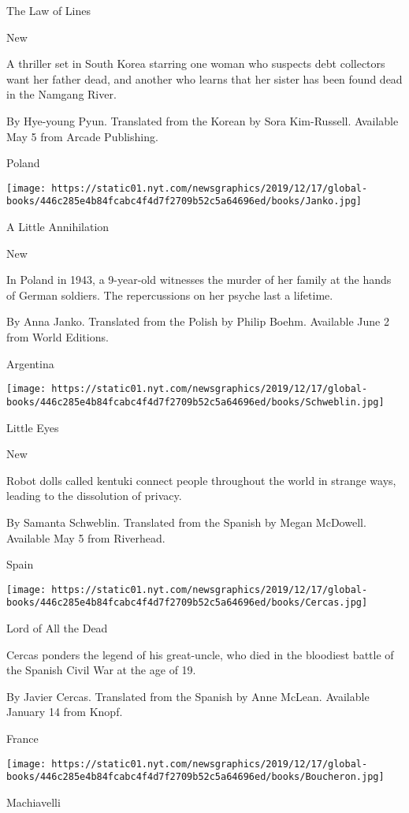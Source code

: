 The Law of Lines

New

A thriller set in South Korea starring one woman who suspects debt
collectors want her father dead, and another who learns that her sister
has been found dead in the Namgang River.

 By Hye-young Pyun. Translated from the Korean by Sora Kim-Russell.
Available May 5 from Arcade Publishing.

Poland

\texttt{[image: https://static01.nyt.com/newsgraphics/2019/12/17/global-books/446c285e4b84fcabc4f4d7f2709b52c5a64696ed/books/Janko.jpg]}

A Little Annihilation

New

In Poland in 1943, a 9-year-old witnesses the murder of her family at
the hands of German soldiers. The repercussions on her psyche last a
lifetime.

 By Anna Janko. Translated from the Polish by Philip Boehm. Available
June 2 from World Editions.

Argentina

\texttt{[image: https://static01.nyt.com/newsgraphics/2019/12/17/global-books/446c285e4b84fcabc4f4d7f2709b52c5a64696ed/books/Schweblin.jpg]}

Little Eyes

New

Robot dolls called kentuki connect people throughout the world in
strange ways, leading to the dissolution of privacy.

 By Samanta Schweblin. Translated from the Spanish by Megan McDowell.
Available May 5 from Riverhead.

Spain

\texttt{[image: https://static01.nyt.com/newsgraphics/2019/12/17/global-books/446c285e4b84fcabc4f4d7f2709b52c5a64696ed/books/Cercas.jpg]}

Lord of All the Dead

Cercas ponders the legend of his great-uncle, who died in the bloodiest
battle of the Spanish Civil War at the age of 19.

 By Javier Cercas. Translated from the Spanish by Anne McLean. Available
January 14 from Knopf.

France

\texttt{[image: https://static01.nyt.com/newsgraphics/2019/12/17/global-books/446c285e4b84fcabc4f4d7f2709b52c5a64696ed/books/Boucheron.jpg]}

Machiavelli

